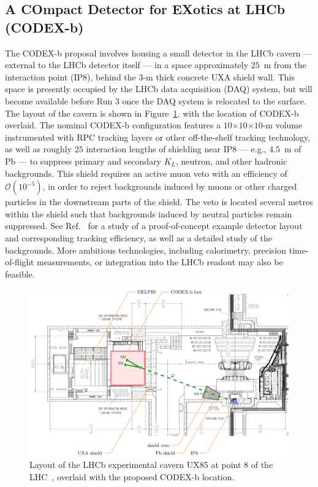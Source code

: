 \subsection{A COmpact Detector for EXotics at LHCb (CODEX-b)}
\label{sec:CODEX-b}

The CODEX-b proposal involves housing a small detector in the LHCb cavern --- external to the LHCb detector itself --- in a space approximately $25$~m from the interaction point (IP8), behind the 3-m thick concrete UXA shield wall. This space is presently occupied by the LHCb data acquisition (DAQ) system, but will become available before Run 3 once the DAQ system is relocated to the surface. The layout of the cavern is shown in Figure~\ref{fig:LHCbCav}, with the location of CODEX-b overlaid. The nominal CODEX-b configuration features a $10$$\times10$$\times10$-m volume instrumented with RPC tracking layers or other off-the-shelf tracking technology, as well as roughly $25$ interaction lengths of shielding near IP8 --- e.g., $4.5$~m of Pb --- to suppress primary and secondary $K_L$, neutron, and other hadronic backgrounds. This shield requires an active muon veto with an efficiency of $\mathcal{O}(10^{-5})$, in order to reject backgrounds induced by muons or other charged particles in the downstream parts of the shield. The veto is located several metres within the shield such that backgrounds induced by neutral particles remain suppressed. See Ref.~\cite{Gligorov:2017nwh} for a study of a proof-of-concept example detector layout and corresponding tracking efficiency, as well as a detailed study of the backgrounds. More ambitious technologies, including calorimetry, precision time-of-flight measurements, or integration into the LHCb readout may also be feasible.

\begin{figure}[th]\centering
	\includegraphics[width = 0.8\linewidth]{plots/LHCbCavern}
	\caption{Layout of the LHCb experimental cavern UX85 at point 8 of the LHC~\cite{cavern}, overlaid with the proposed CODEX-b location.}
	\label{fig:LHCbCav}
\end{figure}

